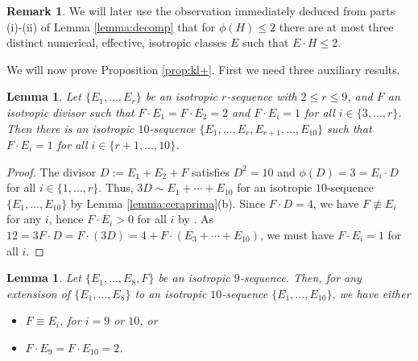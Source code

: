 \documentclass[11pt]{amsart}
\newtheorem{lemma}[thm]{Lemma}
\theoremstyle{definition}
\newtheorem{remark}[thm]{Remark}
\begin{document}
\begin{remark} \label{rem:decomp} We will later use the observation immediately deduced from parts (i)-(ii) of Lemma \ref {lemma:decomp} that for $\phi(H)\leqslant 2$  there are at most three \color{black} distinct \color{black} numerical, effective, isotropic classes $E$ such that $E \cdot H \leqslant 2$.
\end{remark}




 We will now prove 
Proposition \ref{prop:kl+}. First we need three auxiliary results.



 


\begin{lemma} \label{lemma:ext1}
Let $\{E_1,\ldots,E_r\}$ be an isotropic $r$-sequence with $2
\leqslant r \leqslant 9$, 
and $F$ an isotropic divisor such that $F \cdot E_1=F \cdot E_2=2$ and
$F \cdot E_i=1$ for all $i \in\{3,\ldots, r\}$.
Then there is an isotropic $10$-sequence $\{E_1,\ldots,
E_r,E_{r+1},\ldots, E_{10}\}$ such that $F \cdot E_i=1$ for all $i
\in\{r+1,\ldots,10\}$.
\end{lemma}

\begin{proof}
  The divisor $D:=E_1+E_2+F$ satisfies $D^2=10$ and $\phi(D)=3=E_i \cdot D$ for all $i \in \{1,\ldots,r\}$. Thus, $3D \sim E_1+\cdots+E_{10}$ for an isotropic $10$-sequence $\{E_1,\ldots,  E_{10}\}$ by Lemma \ref{lemma:ceraprima}(b). Since $F \cdot D=4$, we have $F \not \equiv E_i$ for any $i$, hence $F \cdot E_i >0$ for all $i$ by \cite[Lemma 2.1]{klvan}. As 
$12= 3F \cdot D= F \cdot (3D)= 4+F \cdot (E_3+\cdots+E_{10})$, we must have $F \cdot E_i=1$ for all $i$.
\end{proof}


\begin{lemma} \label{lemma:ext0}
  Let $\{E_1,\ldots,E_8,F\}$ be an isotropic $9$-sequence. Then, for any extensison of $\{E_1,\ldots,E_8\}$ to an isotropic $10$-sequence $\{E_1,\ldots,E_{10}\}$, we have either
  \begin{itemize}
  \item[(i)] $F \equiv E_i$, for $i=9$ or $10$, or
  \item[(ii)] $F \cdot E_9=F \cdot E_{10}=2$.
  \end{itemize}
\end{lemma}
\end{document}
